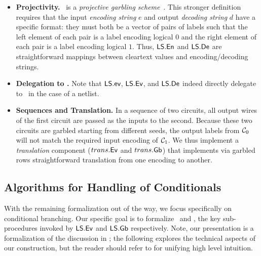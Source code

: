 \begin{itemize}
  \item \textbf{Projectivity.} \ourschemelong\
    is a \emph{projective garbling scheme}~\cite{CCS:BelHoaRog12}.
    This stronger definition requires that the input \emph{encoding string}
    $e$ and output \emph{decoding string} $d$ have a specific format:
    they must both be a vector of pairs of labels such that the left
    element of each pair is a label encoding logical $0$ and the right
    element of each pair is a label encoding logical $1$.
    Thus, $\textsf{LS}.\textsf{En}$ and $\textsf{LS}.\textsf{De}$ are straightforward
    mappings between cleartext values and encoding/decoding strings.
  \item \textbf{Delegation to \underscheme.} Note that
    $\textsf{LS}.\textsf{ev}$, $\textsf{LS}.\textsf{Ev}$, and $\textsf{LS}.\textsf{De}$ indeed
    directly delegate to \underscheme\ in the case of a netlist.
  \item \textbf{Sequences and Translation.} In a sequence of two
    circuits, all output wires of the first circuit are passed as the inputs
    to the second. Because these two circuits are garbled starting
    from different seeds, the output labels from $\mathcal C_0$ will not match the required
    input encoding of $\mathcal C_1$.
    We thus implement a \emph{translation} component ($trans.\textsf{Ev}$
    and $trans.\textsf{Gb}$) that implements via garbled rows
    straightforward translation from one encoding to another.
\end{itemize}

\subsection{Algorithms for Handling of Conditionals}\label{sec:approach-cond}

With the remaining formalization out of the way, we focus specifically
on conditional branching. Our specific goal is to formalize \evcond\
and \gbcond, the key sub-procedures invoked by $\textsf{LS}.\textsf{Ev}$ and
$\textsf{LS}.\textsf{Gb}$ respectively.
Note, our presentation is a formalization of the discussion in
; the following explores the technical aspects
of our construction, but the reader should refer to
\Cref{sec:techOverview} for unifying high level intuition.

